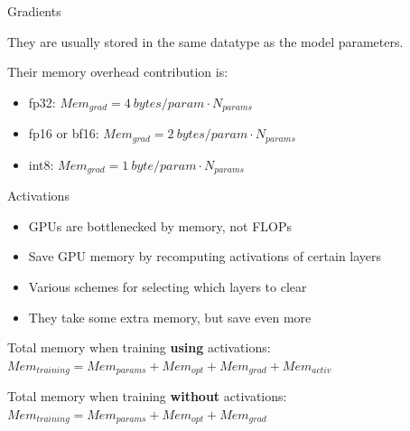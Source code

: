 
\begin{vbframe}{Gradients}

\vfill

They are usually stored in the same datatype as the model parameters. \newline

Their memory overhead contribution is: \newline


\begin{itemize}
 	\item fp32: $Mem_{grad} = 4 ~bytes/param \cdot N_{params}$
 	\item fp16 or bf16: $Mem_{grad} = 2 ~bytes/param \cdot N_{params}$
	\item int8: $Mem_{grad} = 1 ~byte/param \cdot N_{params}$
\end{itemize}

\vfill

\end{vbframe}


\begin{vbframe}{Activations}

\vfill

\begin{itemize}
 	\item GPUs are bottlenecked by memory, not FLOPs
 	\item Save GPU memory by recomputing activations of certain layers
	\item Various schemes for selecting which layers to clear
	\item They take some extra memory, but save even more
\end{itemize}

\vskip5mm

Total memory when training \textbf{using} activations: \newline
$Mem_{training} = Mem_{params} + Mem_{opt} + Mem_{grad} + Mem_{activ}$

\vskip5mm


Total memory when training \textbf{without} activations: \newline
$Mem_{training} = Mem_{params} + Mem_{opt} + Mem_{grad}$

\vskip5mm


\vfill

\end{vbframe}

